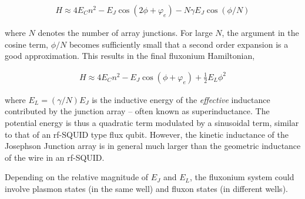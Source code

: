 \documentclass[svgnames]{article}     %
\begin{document}
 \begin{align} \label{fluxonium}
  H \approx 4E_C n^2 - E_J \cos (2\phi + \varphi_e) - N\gamma E_J \cos(\phi
  / N)
\end{align}\vspace{3px}

where $N$ denotes the number of array junctions. For large $N$, the argument in
the cosine term,  $\phi / N$ becomes sufficiently small that a second order
expansion is a good approximation. This results in the final fluxonium
Hamiltonian, 

\begin{align} \label{fluxoniumf}
  H \approx 4E_C n^2 - E_J \cos (\phi + \varphi_e) + \frac{1}{2}E_L \phi^2
\end{align}\vspace{3px}

where  $E_L = (\gamma / N)E_J$ is the inductive energy of the
\textit{effective} inductance contributed by the junction array -- often known
as superinductance. The potential energy is thus a quadratic term modulated by
a sinusoidal term, similar to that of an rf-SQUID type flux qubit. However, the
kinetic inductance of the Josephson Junction array is in general much larger
than the geometric inductance of the wire in an rf-SQUID. 

Depending on the relative magnitude of $E_J$ and $E_L$, the fluxonium system
could involve plasmon states (in the same well) and fluxon states (in different
wells). 
\end{document}
